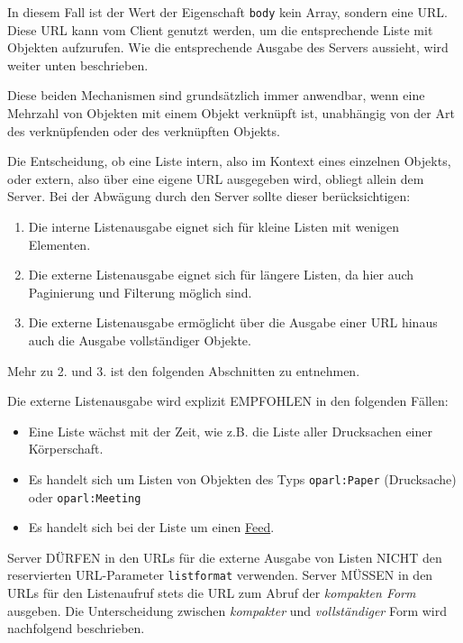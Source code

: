 \documentclass[,a4paper]{article}
\begin{document}
In diesem Fall ist der Wert der Eigenschaft \texttt{body} kein Array,
sondern eine URL. Diese URL kann vom Client genutzt werden, um die
entsprechende Liste mit Objekten aufzurufen. Wie die entsprechende
Ausgabe des Servers aussieht, wird weiter unten beschrieben.

Diese beiden Mechanismen sind grundsätzlich immer anwendbar, wenn eine
Mehrzahl von Objekten mit einem Objekt verknüpft ist, unabhängig von der
Art des verknüpfenden oder des verknüpften Objekts.

Die Entscheidung, ob eine Liste intern, also im Kontext eines einzelnen
Objekts, oder extern, also über eine eigene URL ausgegeben wird, obliegt
allein dem Server. Bei der Abwägung durch den Server sollte dieser
berücksichtigen:

\begin{enumerate}
\def\labelenumi{\arabic{enumi}.}
\item
  Die interne Listenausgabe eignet sich für kleine Listen mit wenigen
  Elementen.
\item
  Die externe Listenausgabe eignet sich für längere Listen, da hier auch
  Paginierung und Filterung möglich sind.
\item
  Die externe Listenausgabe ermöglicht über die Ausgabe einer URL hinaus
  auch die Ausgabe vollständiger Objekte.
\end{enumerate}

Mehr zu 2. und 3. ist den folgenden Abschnitten zu entnehmen.

Die externe Listenausgabe wird explizit EMPFOHLEN in den folgenden
Fällen:

\begin{itemize}
\item
  Eine Liste wächst mit der Zeit, wie z.B. die Liste aller Drucksachen
  einer Körperschaft.
\item
  Es handelt sich um Listen von Objekten des Typs \texttt{oparl:Paper}
  (Drucksache) oder \texttt{oparl:Meeting}
\item
  Es handelt sich bei der Liste um einen \hyperref[feeds]{Feed}.
\end{itemize}

Server DÜRFEN in den URLs für die externe Ausgabe von Listen NICHT den
reservierten URL-Parameter \texttt{listformat} verwenden. Server MÜSSEN
in den URLs für den Listenaufruf stets die URL zum Abruf der
\emph{kompakten Form} ausgeben. Die Unterscheidung zwischen
\emph{kompakter} und \emph{vollständiger} Form wird nachfolgend
beschrieben.
\end{document}
